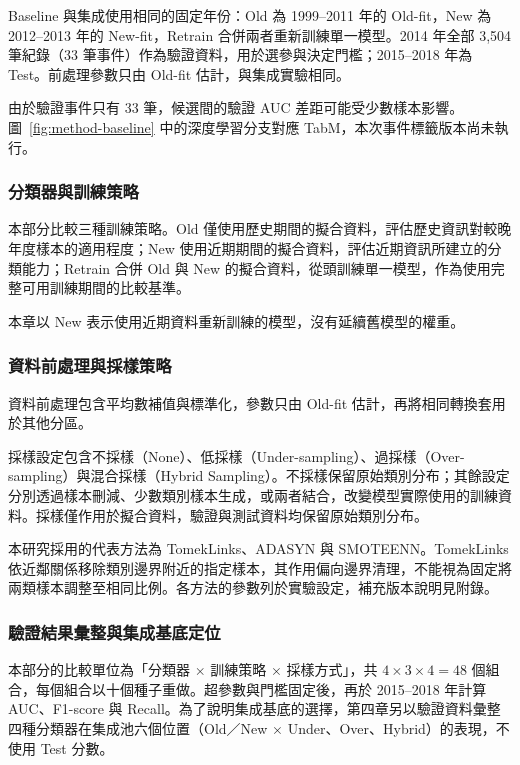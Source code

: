 Baseline 與集成使用相同的固定年份：Old 為 1999--2011 年的 Old-fit，New 為 2012--2013 年的 New-fit，Retrain 合併兩者重新訓練單一模型。2014 年全部 3,504 筆紀錄（33 筆事件）作為驗證資料，用於選參與決定門檻；2015--2018 年為 Test。前處理參數只由 Old-fit 估計，與集成實驗相同。

由於驗證事件只有 33 筆，候選間的驗證 AUC 差距可能受少數樣本影響。圖~\ref{fig:method-baseline} 中的深度學習分支對應 TabM，本次事件標籤版本尚未執行。

\subsubsection{分類器與訓練策略}

本部分比較三種訓練策略。Old 僅使用歷史期間的擬合資料，評估歷史資訊對較晚年度樣本的適用程度；New 使用近期期間的擬合資料，評估近期資訊所建立的分類能力；Retrain 合併 Old 與 New 的擬合資料，從頭訓練單一模型，作為使用完整可用訓練期間的比較基準。

本章以 New 表示使用近期資料重新訓練的模型，沒有延續舊模型的權重。

\subsubsection{資料前處理與採樣策略}

資料前處理包含平均數補值與標準化，參數只由 Old-fit 估計，再將相同轉換套用於其他分區。

採樣設定包含不採樣（None）、低採樣（Under-sampling）、過採樣（Over-sampling）與混合採樣（Hybrid Sampling）。不採樣保留原始類別分布；其餘設定分別透過樣本刪減、少數類別樣本生成，或兩者結合，改變模型實際使用的訓練資料。採樣僅作用於擬合資料，驗證與測試資料均保留原始類別分布。

本研究採用的代表方法為 TomekLinks、ADASYN 與 SMOTEENN。TomekLinks 依近鄰關係移除類別邊界附近的指定樣本，其作用偏向邊界清理，不能視為固定將兩類樣本調整至相同比例。各方法的參數列於實驗設定，補充版本說明見附錄。

\subsubsection{驗證結果彙整與集成基底定位}

本部分的比較單位為「分類器 \ensuremath{\times} 訓練策略 \ensuremath{\times} 採樣方式」，共 \(4\times3\times4=48\) 個組合，每個組合以十個種子重做。超參數與門檻固定後，再於 2015--2018 年計算 AUC、F1-score 與 Recall。為了說明集成基底的選擇，第四章另以驗證資料彙整四種分類器在集成池六個位置（Old／New \ensuremath{\times} Under、Over、Hybrid）的表現，不使用 Test 分數。

